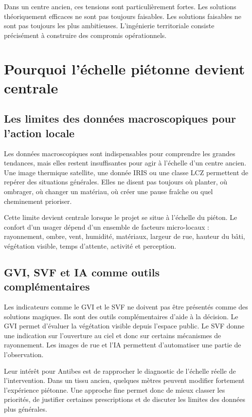 \documentclass[11pt,a4paper]{report}
\begin{document}
Dans un centre ancien, ces tensions sont particulièrement fortes. Les solutions théoriquement efficaces ne sont pas toujours faisables. Les solutions faisables ne sont pas toujours les plus ambitieuses. L'ingénierie territoriale consiste précisément à construire des compromis opérationnels.

\section{Pourquoi l'échelle piétonne devient centrale}

\subsection{Les limites des données macroscopiques pour l'action locale}

Les données macroscopiques sont indispensables pour comprendre les grandes tendances, mais elles restent insuffisantes pour agir à l'échelle d'un centre ancien. Une image thermique satellite, une donnée IRIS ou une classe LCZ permettent de repérer des situations générales. Elles ne disent pas toujours où planter, où ombrager, où changer un matériau, où créer une pause fraîche ou quel cheminement prioriser.

Cette limite devient centrale lorsque le projet se situe à l'échelle du piéton. Le confort d'un usager dépend d'un ensemble de facteurs micro-locaux : rayonnement, ombre, vent, humidité, matériaux, largeur de rue, hauteur du bâti, végétation visible, temps d'attente, activité et perception.

\subsection{GVI, SVF et IA comme outils complémentaires}

Les indicateurs comme le GVI et le SVF ne doivent pas être présentés comme des solutions magiques. Ils sont des outils complémentaires d'aide à la décision. Le GVI permet d'évaluer la végétation visible depuis l'espace public. Le SVF donne une indication sur l'ouverture au ciel et donc sur certains mécanismes de rayonnement. Les images de rue et l'IA permettent d'automatiser une partie de l'observation.

Leur intérêt pour Antibes est de rapprocher le diagnostic de l'échelle réelle de l'intervention. Dans un tissu ancien, quelques mètres peuvent modifier fortement l'expérience piétonne. Une approche fine permet donc de mieux classer les priorités, de justifier certaines prescriptions et de discuter les limites des données plus générales.
\end{document}
